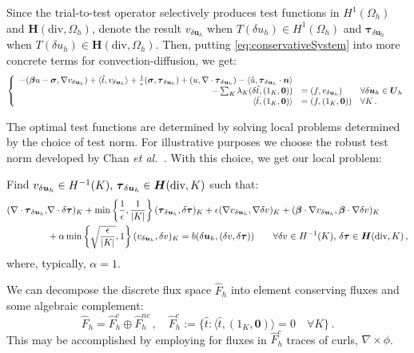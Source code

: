 \documentclass[letterpaper]{article}
\def\btau{\boldsymbol\tau}
\def\bsigma{\boldsymbol\sigma}
\def\bbeta{\boldsymbol\beta}
\newcommand{\bs}[1]{\boldsymbol{#1}}
\newcommand{\bfH}{\mbox{\boldmath $H$}}
\newcommand{\HdivK}{\bfH(\text{div},K)}
\newcommand{\HOneK}{H^{-1}(K)}
\newcommand{\vdeltau}{v_{\delta\bs u_h}}
\newcommand{\taudeltau}{\btau_{\delta\bs u_h}}
\def\etal{{\it et al.~}}
\begin{document}
Since the trial-to-test operator selectively produces test functions in
$H^1(\Omega_h)$ and $\bs H(\text{div},\Omega_h)$, denote the result
$v_{\delta\bs u_h}$ when $T(\delta u_h)\in H^1(\Omega_h)$ and
$\btau_{\delta\bs u_h}$ when $T(\delta u_h)\in \bs H(\text{div},\Omega_h)$.
Then, putting \eqref{eq:conservativeSystem} into more concrete terms for
convection-diffusion, we get:
\begin{equation}
\left\{
\begin{array}[c]{rll}
-(\bbeta u-\bsigma,\nabla \vdeltau)+\langle\hat t,\vdeltau\rangle
+ \frac{1}{\epsilon}(\bsigma,\taudeltau)
+(u,\nabla\cdot\taudeltau)
-\langle\hat u,\taudeltau\cdot\bs n\rangle\\
-\sum_K\lambda_K (\delta\hat t,(1_K,\bs0))
&=(f,\vdeltau) & \forall\delta\bs u_h\in\bs U_h\\
\langle\hat t,(1_K,\bs0)\rangle &=(f,(1_K,\bs0)) & \forall K\,.
\end{array}
\right.
\label{eq:conservativeConfusionSystem}
\end{equation}

The optimal test functions are determined by solving local problems determined
by the choice of test norm. For illustrative purposes we choose the robust
test norm developed by Chan \etal\cite{ChanHeuerThanhDemkowicz2012}. With this
choice, we get our local problem:

Find $\vdeltau\in\HOneK,\,\taudeltau\in\HdivK$ such that:
\begin{align}
(\nabla\cdot\taudeltau,&\nabla\cdot\delta\btau)_K
+\min\left\{\frac{1}{\epsilon},\frac{1}{|K|}\right\}(\taudeltau,\delta\btau)_K
+\epsilon(\nabla\vdeltau,\nabla \delta v)_K
+(\bbeta\cdot\nabla\vdeltau,\bbeta\cdot\nabla \delta v)_K\nonumber\\
&+\alpha\min\left\{\sqrt{\frac{\epsilon}{|K|}},1\right\}(\vdeltau,\delta v)_K
=b(\delta\bs u_h,(\delta v,\delta\btau))
\quad\quad\forall\delta v\in\HOneK,\,\delta\btau\in\HdivK\,,
\label{eq:localSolve}
\end{align}
where, typically, $\alpha=1$.

We can decompose the discrete flux space $\hat F_h$ into element conserving
fluxes and some algebraic complement:
\begin{equation}
\hat F_h=\hat F_h^c\oplus\hat F_h^{nc}\,,\quad\hat 
F_h^{c}:=\{\hat t:\langle\hat t,(1_K,\bs0)\rangle=0\quad\forall K\}\,.
\label{eq:decomposition}
\end{equation}
This may be accomplished by employing for fluxes in $\hat F_h^{c}$ traces of
curls, $\nabla\times\phi$. 
\end{document}
